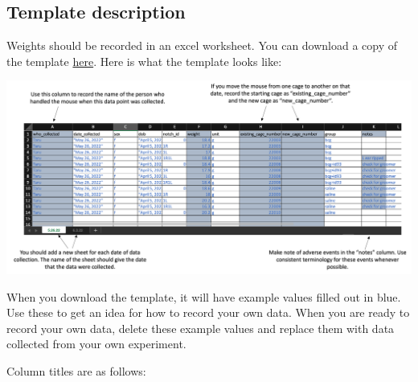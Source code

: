 \documentclass[
]{book}
\begin{document}
\hypertarget{template-description}{%
\subsection{Template description}\label{template-description}}

Weights should be recorded in an excel worksheet. You can download a copy of the
template \href{https://github.com/csu-impactb/CODING-TEAM-BOOKDOWN-/raw/main/DATA/body_weights_template.xlsx}{here}. Here is what the template looks like:

\includegraphics[width=60.03in]{figures/weight_template}

When you download the template, it will have example values filled out in blue.
Use these to get an idea for how to record your own data. When you are ready
to record your own data, delete these example values and replace them with
data collected from your own experiment.

Column titles are as follows:
\end{document}
